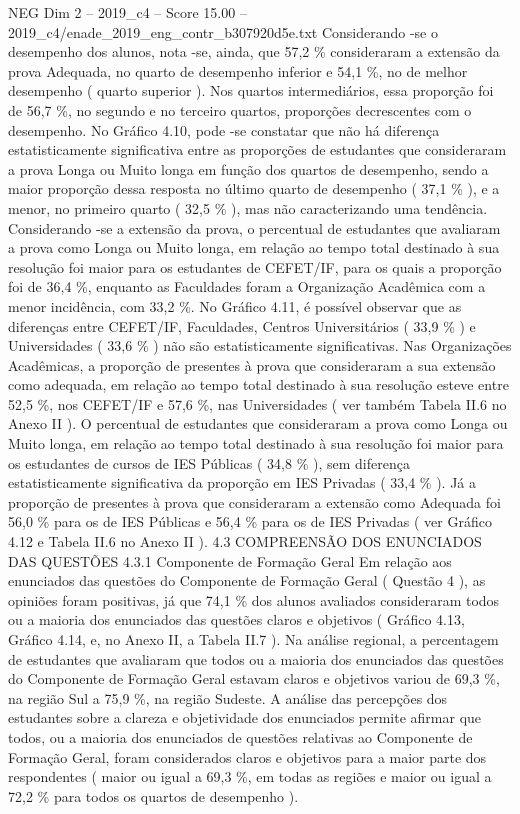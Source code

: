 \begin{textsample}{NEG Dim 2 – 2019\_c4 – Score 15.00 – 2019\_c4/enade\_2019\_eng\_contr\_b307920d5e.txt}
Considerando -se o desempenho dos alunos, nota -se, ainda, que 57,2 \% consideraram a extensão da prova Adequada, no quarto de desempenho inferior e 54,1 \%, no de melhor desempenho ( quarto superior ).
Nos quartos intermediários, essa proporção foi de 56,7 \%, no segundo e no terceiro quartos, proporções decrescentes com o desempenho.
No Gráfico 4.10, pode -se constatar que não há diferença estatisticamente significativa entre as proporções de estudantes que consideraram a prova Longa ou Muito longa em função dos quartos de desempenho, sendo a maior proporção dessa resposta no último quarto de desempenho ( 37,1 \% ), e a menor, no primeiro quarto ( 32,5 \% ), mas não caracterizando uma tendência.
Considerando -se a extensão da prova, o percentual de estudantes que avaliaram a prova como Longa ou Muito longa, em relação ao tempo total destinado à sua resolução foi maior para os estudantes de CEFET/IF, para os quais a proporção foi de 36,4 \%, enquanto as Faculdades foram a Organização Acadêmica com a menor incidência, com 33,2 \%.
No Gráfico 4.11, é possível observar que as diferenças entre CEFET/IF, Faculdades, Centros Universitários ( 33,9 \% ) e Universidades ( 33,6 \% ) não são estatisticamente significativas.
Nas Organizações Acadêmicas, a proporção de presentes à prova que consideraram a sua extensão como adequada, em relação ao tempo total destinado à sua resolução esteve entre 52,5 \%, nos CEFET/IF e 57,6 \%, nas Universidades ( ver também Tabela II.6 no Anexo II ).
O percentual de estudantes que consideraram a prova como Longa ou Muito longa, em relação ao tempo total destinado à sua resolução foi maior para os estudantes de cursos de IES Públicas ( 34,8 \% ), sem diferença estatisticamente significativa da proporção em IES Privadas ( 33,4 \% ).
Já a proporção de presentes à prova que consideraram a extensão como Adequada foi 56,0 \% para os de IES Públicas e 56,4 \% para os de IES Privadas ( ver Gráfico 4.12 e Tabela II.6 no Anexo II ). 4.3 COMPREENSÃO DOS ENUNCIADOS DAS QUESTÕES 4.3.1 Componente de Formação Geral Em relação aos enunciados das questões do Componente de Formação Geral ( Questão 4 ), as opiniões foram positivas, já que 74,1 \% dos alunos avaliados consideraram todos ou a maioria dos enunciados das questões claros e objetivos ( Gráfico 4.13, Gráfico 4.14, e, no Anexo II, a Tabela II.7 ).
Na análise regional, a percentagem de estudantes que avaliaram que todos ou a maioria dos enunciados das questões do Componente de Formação Geral estavam claros e objetivos variou de 69,3 \%, na região Sul a 75,9 \%, na região Sudeste.
A análise das percepções dos estudantes sobre a clareza e objetividade dos enunciados permite afirmar que todos, ou a maioria dos enunciados de questões relativas ao Componente de Formação Geral, foram considerados claros e objetivos para a maior parte dos respondentes ( maior ou igual a 69,3 \%, em todas as regiões e maior ou igual a 72,2 \% para todos os quartos de desempenho ).

\end{textsample}
